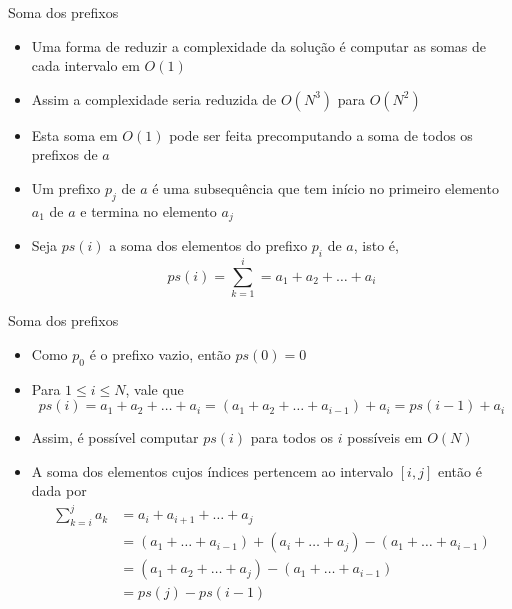 \begin{frame}[fragile]{Soma dos prefixos}

    \begin{itemize}
        \item Uma forma de reduzir a complexidade da solução é computar as somas de cada
            intervalo em $O(1)$

        \item Assim a complexidade seria reduzida de $O(N^3)$ para $O(N^2)$

        \item Esta soma em $O(1)$ pode ser feita precomputando a soma de todos os prefixos
            de $a$

        \item Um prefixo $p_j$ de $a$ é uma subsequência que tem início no primeiro elemento $a_1$
            de $a$ e termina no elemento $a_j$

        \item Seja $ps(i)$ a soma dos elementos do prefixo $p_i$ de $a$, isto é,
        \[
            ps(i) = \sum_{k = 1}^i = a_1 + a_2 + \ldots + a_i
        \]

    \end{itemize}

\end{frame}

\begin{frame}[fragile]{Soma dos prefixos}

    \begin{itemize}
        \item Como $p_0$ é o prefixo vazio, então $ps(0) = 0$

        \item Para $1\leq i\leq N$, vale que
        \[
            ps(i) = a_1 + a_2 + \ldots + a_i = (a_1 + a_2 + \ldots + a_{i - 1}) + a_i =
                ps(i - 1) + a_i
        \]

        \item Assim, é possível computar $ps(i)$ para todos os $i$ possíveis em $O(N)$

        \item A soma dos elementos cujos índices pertencem ao intervalo $[i, j]$ então é dada
            por
        \begin{align*}
            \sum_{k = i}^j a_k &= a_i + a_{i + 1} + \ldots + a_j \\
                &= (a_1 + \ldots + a_{i - 1}) + (a_i + \ldots + a_j) - (a_1 + \ldots + a_{i - 1}) \\
                &= (a_1 + a_2 + \ldots + a_j) - (a_1 + \ldots + a_{i - 1}) \\
                &= ps(j) - ps(i - 1)
        \end{align*}

    \end{itemize}

\end{frame}

